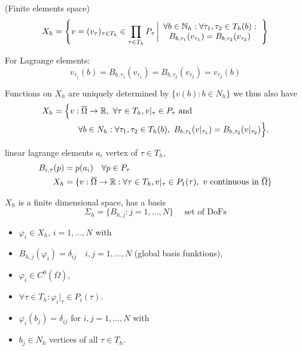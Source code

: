 \begin{definition_}
	(Finite elements space)
	\begin{equation*}
		X_h = \left \{ v = (v_\tau)_{\tau \in T_h} \in \prod \limits_{\tau \in T_h} P_\tau \left|
\begin{array}{c}
\forall b  \in\mathbb{N}_h : \forall \tau_1,\tau_2 \in T_h(b):\\
B_{b,\tau_1}(v_{\tau_1}) = B_{b,\tau_2}(v_{\tau_2}) 
\end{array}		
 \right.\right \}
	\end{equation*}
\end{definition_}
For Lagrange elements:
\begin{equation*}
	v_{\tau_1}(b) = B_{b,\tau_1}(v_{\tau_1}) = B_{b,\tau_2}(v_{\tau_2}) = v_{\tau_2}(b)
\end{equation*}

Functions on $X_h$ are uniquely determined by $\{v(b): b \in N_h \}$ we thus also have 
\begin{align*}
	X_h = \Big \{& v: \overline{\Omega} \to \mathbb{R},\ \forall \tau \in T_h, v|_\tau \in P_\tau \text{ and }\\ &{} \quad \forall b \in N_h: \forall \tau_1,\tau_2 \in T_h(b) ,\ B_{b,\tau_1}(v|_{\tau_1}) = B_{b,\tau_2}(v|_{\tau_2})  \Big\}.
\end{align*}

\begin{example}
	linear lagrange elements $a_i$ vertex of $\tau \in T_h$,
	\begin{align*}
		B_{i,\tau}(p)  &= p(a_i) \quad \forall p \in P_\tau \\
		X_h &= \{ v:\overline{\Omega} \to \mathbb{R} : \forall \tau \in T_h, v|_{\tau} \in P_1(\tau) ,\ v \text{ continuous in } \overline{\Omega} \}
	\end{align*}
\end{example}

$X_h$ is a finite dimensional space, has a basis
\begin{equation*}
	\Sigma_h = \{ B_{h,j} : j= 1,\dots,N  \} \quad \text{ set of DoFs} 
\end{equation*}


\begin{itemize}
	\item $\varphi_i \in X_h$, $ i=1,\dots,N$ with
	\item  $B_{h,j}(\varphi_i) = \delta_{ij} \quad i,j=1,\dots,N$ (global basis funktions),
	\item $\varphi_i \in C^0(\overline{\Omega})$,
	\item  $\forall \tau \in T_h: \varphi_i|_\tau \in P_i(\tau)$.
	\item $\varphi_i(b_j) = \delta_{ij}$ for $i,j = 1,\dots,N$ with 
	\item $b_j \in N_h$ vertices of all $\tau \in T_h$.
\end{itemize}

